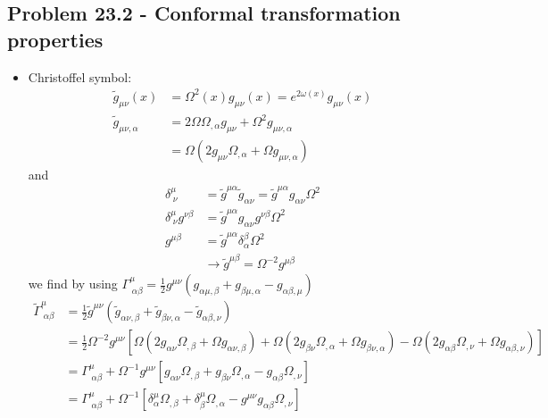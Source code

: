 \documentclass[10pt,a4paper]{book}
\theoremstyle{definition}
\begin{document}
\subsection{Problem 23.2 - Conformal transformation properties}
\begin{itemize}
\item Christoffel symbol:
\begin{align}
    \tilde{g}_{\mu\nu}(x)&=\Omega^2(x)g_{\mu\nu}(x)=e^{2\omega(x)}g_{\mu\nu}(x)\\
    \tilde{g}_{\mu\nu,\alpha}
    &=2\Omega\Omega_{,\alpha}g_{\mu\nu}+\Omega^2g_{\mu\nu,\alpha}\\
    &=\Omega(2g_{\mu\nu}\Omega_{,\alpha}+\Omega g_{\mu\nu,\alpha})
\end{align}
and
\begin{align}
\delta^\mu_{\;\nu}&=\tilde{g}^{\mu\alpha}\tilde{g}_{\alpha\nu}=\tilde{g}^{\mu\alpha}g_{\alpha\nu}\Omega^2\\
\delta^\mu_{\;\nu}g^{\nu\beta}&=\tilde{g}^{\mu\alpha}g_{\alpha\nu}g^{\nu\beta}\Omega^2\\
g^{\mu\beta}&=\tilde{g}^{\mu\alpha}\delta^\beta_\alpha\Omega^2\\
&\rightarrow\tilde{g}^{\mu\beta}=\Omega^{-2}g^{\mu\beta}
\end{align}
we find by using $\Gamma^\mu_{\;\alpha\beta}=\frac{1}{2}g^{\mu\nu}\left(g_{\alpha\mu,\beta}+g_{\beta\mu,\alpha}-g_{\alpha\beta,\mu}\right)$
\begin{align}
\tilde\Gamma^\mu_{\;\alpha\beta}
&=\frac{1}{2}\tilde{g}^{\mu\nu}\left(\tilde{g}_{\alpha\nu,\beta}+\tilde{g}_{\beta\nu,\alpha}-\tilde{g}_{\alpha\beta,\nu}\right)\\
&=\frac{1}{2}\Omega^{-2}g^{\mu\nu}\left[
 \Omega(2g_{\alpha\nu}\Omega_{,\beta}+\Omega g_{\alpha\nu,\beta})
+\Omega(2g_{\beta\nu}\Omega_{,\alpha}+\Omega g_{\beta\nu,\alpha})
-\Omega(2g_{\alpha\beta}\Omega_{,\nu}+\Omega g_{\alpha\beta,\nu})
\right]\\
&=\Gamma^\mu_{\;\alpha\beta}+\Omega^{-1}g^{\mu\nu}\left[
 g_{\alpha\nu}\Omega_{,\beta}
+g_{\beta\nu}\Omega_{,\alpha}
-g_{\alpha\beta}\Omega_{,\nu}
\right]\\
&=\Gamma^\mu_{\;\alpha\beta}+\Omega^{-1}\left[
 \delta^\mu_\alpha\Omega_{,\beta}
+\delta_\beta^\mu\Omega_{,\alpha}
-g^{\mu\nu}g_{\alpha\beta}\Omega_{,\nu}
\right]
\end{align}


\end{itemize}
\end{document}
